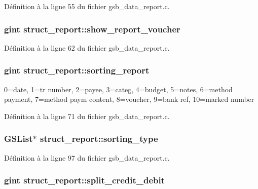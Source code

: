 Définition à la ligne 55 du fichier gsb\_\-data\_\-report.c.

\subsubsection[{show\_\-report\_\-voucher}]{\setlength{\rightskip}{0pt plus 5cm}gint {\bf struct\_\-report::show\_\-report\_\-voucher}}\label{structstruct__report_aa80d2b539cbe691962980260ea7474fc}


Définition à la ligne 62 du fichier gsb\_\-data\_\-report.c.

\subsubsection[{sorting\_\-report}]{\setlength{\rightskip}{0pt plus 5cm}gint {\bf struct\_\-report::sorting\_\-report}}\label{structstruct__report_a65cfd3a48752160bb8353e3e4afd41c5}
0=date, 1=tr number, 2=payee, 3=categ, 4=budget, 5=notes, 6=method payment, 7=method paym content, 8=voucher, 9=bank ref, 10=marked number 

Définition à la ligne 71 du fichier gsb\_\-data\_\-report.c.

\subsubsection[{sorting\_\-type}]{\setlength{\rightskip}{0pt plus 5cm}GSList$\ast$ {\bf struct\_\-report::sorting\_\-type}}\label{structstruct__report_a4ce79a5283c9ff43ce3de5babbb50446}


Définition à la ligne 97 du fichier gsb\_\-data\_\-report.c.

\subsubsection[{split\_\-credit\_\-debit}]{\setlength{\rightskip}{0pt plus 5cm}gint {\bf struct\_\-report::split\_\-credit\_\-debit}}\label{structstruct__report_adcb9c369bcbf1b8d5d517253b4bd80a6}


